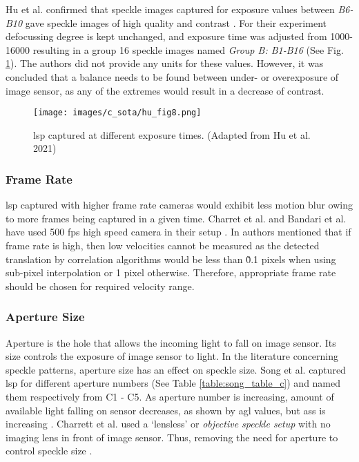     \vspace{5mm}

    \noindent Hu et al. confirmed that speckle images captured for exposure values between \emph{B6-B10} gave speckle images of high quality and contrast \noindent \cite{hu}. For their experiment defocussing degree is kept unchanged, and exposure time was adjusted from 1000-16000 resulting in a group 16 speckle images named \emph{Group B: B1-B16} (See Fig. \ref{fig:hu_fig8}). The authors did not provide any units for these values. However, it was concluded that a balance needs to be found between under- or overexposure of image sensor, as any of the extremes would result in a decrease of contrast.

    \begin{figure}[ht]
        \centering
        \texttt{[image: images/c\_sota/hu\_fig8.png]}
        \caption{\gls{lsp} captured at different exposure times. (Adapted from Hu et al. 2021) \cite{hu}}
        \label{fig:hu_fig8}
    \end{figure}

    \subsubsection{Frame Rate}\label{Subsubsection:Frame_Rate}
    \Gls{lsp} captured with higher frame rate cameras would exhibit less motion blur owing to more frames being captured in a given time. Charret et al. and Bandari et al. have used 500 \gls{fps} high speed camera in their setup \cite{charrett_2018} \cite{bandari}. In \cite{charrett_mars} authors mentioned that if frame rate is high, then low velocities cannot be measured as the detected translation by correlation algorithms would be less than \~0.1 pixels when using sub-pixel interpolation or 1 pixel otherwise. Therefore, appropriate frame rate should be chosen for required velocity range.

    
    \subsubsection{Aperture Size}
    Aperture is the hole that allows the incoming light to fall on image sensor. Its size controls the exposure of image sensor to light. In the literature concerning speckle patterns, aperture size has an effect on speckle size. Song et al. captured \gls{lsp} for different aperture numbers (See Table \ref{table:song_table_c}) and named them respectively from C1 - C5. As aperture number is increasing, amount of available light falling on sensor decreases, as shown by \gls{agl} values, but \gls{ass} is increasing \cite{song}. Charrett et al. used a `lensless' or \emph{objective speckle setup} with no imaging lens in front of image sensor. Thus, removing the need for aperture to control speckle size \cite{charrett_2018, francis_autonomous}.
    

